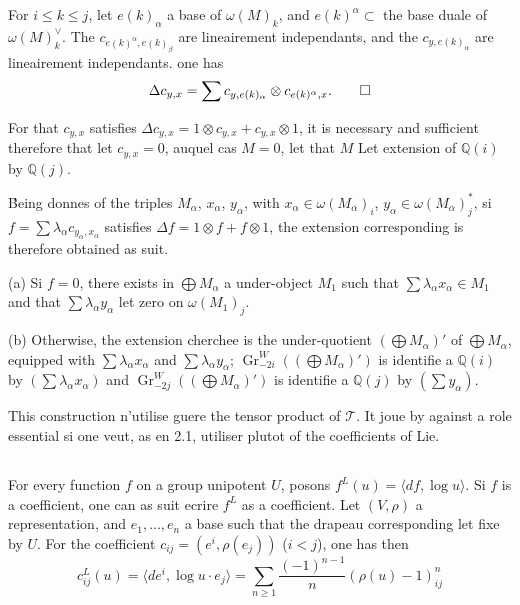 \documentclass[12pt,a4paper]{article}
\theoremstyle{plain}
\theoremstyle{definition}
\theoremstyle{remark}
\newcommand{\Q}{\mathbb{Q}}
\begin{document}
{{For $i\leq k\leq j$, let $e(k)_\alpha$ a base of $\omega(M)_k$, and $e(k)^\alpha\subset$ the base duale of $\omega(M)_k^\vee$. The $c_{e(k)^\alpha,e(k)_\beta}$ are lineairement independants, and the $c_{y,e(k)_\alpha}$ are lineairement independants. one has
\begin{equation*}
\Delta c_{y,x} = \sum c_{y,e(k)_\alpha}\otimes c_{e(k)^\alpha,x}.\qedhere
\end{equation*}

For that $c_{y,x}$ satisfies $\Delta c_{y,x}=1\otimes c_{y,x}+c_{y,x}\otimes 1$, it is necessary and sufficient therefore that let $c_{y,x}=0$, auquel cas $M=0$, let that $M$ Let extension of $\Q(i)$ by $\Q(j)$.

\'Being donnes of the triples $M_\alpha$, $x_\alpha$, $y_\alpha$, with $x_\alpha\in\omega(M_\alpha)_i$, $y_\alpha\in\omega(M_\alpha)_j^*$, si $f=\sum\lambda_\alpha c_{y_\alpha,x_\alpha}$ satisfies $\Delta f=1\otimes f+f\otimes 1$, the extension corresponding is therefore obtained as suit.

(a) Si $f=0$, there exists in $\bigoplus M_\alpha$ a under-object $M_1$ such that $\sum\lambda_\alpha x_\alpha\in M_1$ and that $\sum\lambda_\alpha y_\alpha$ let zero on $\omega(M_1)_j$.

(b) Otherwise, the extension cherchee is the under-quotient $(\bigoplus M_\alpha)'$ of $\bigoplus M_\alpha$, equipped with $\sum\lambda_\alpha x_\alpha$ and $\sum\lambda_\alpha y_\alpha$; $\operatorname{Gr}_{-2i}^W((\bigoplus M_\alpha)')$ is identifie {a} $\Q(i)$ by $(\sum\lambda_\alpha x_\alpha)$ and $\operatorname{Gr}_{-2j}^W((\bigoplus M_\alpha)')$ is identifie {a} $\Q(j)$ by $(\sum y_\alpha)$.

This construction n'utilise guere the tensor product of $\mathcal{T}$. It joue by against a role essential si one veut, as en 2.1, utiliser plutot of the coefficients of Lie.

\subsection{}

For every function $f$ on a group unipotent $U$, posons $f^L(u)=\langle df,\log u\rangle$. Si $f$ is a coefficient, one can as suit ecrire $f^L$ as a coefficient. Let $(V,\rho)$ a representation, and $e_1,\ldots,e_n$ a base such that the drapeau corresponding let fixe by $U$. For the coefficient $c_{ij}=(e^i,\rho(e_j))$ ($i<j$), one has then
\begin{equation*}
c_{ij}^L(u) = \langle de^i,\log u\cdot e_j\rangle = \sum_{n\geq 1}\frac{(-1)^{n-1}}{n}(\rho(u)-1)^n_{ij}
\end{equation*}

}}
\end{document}
